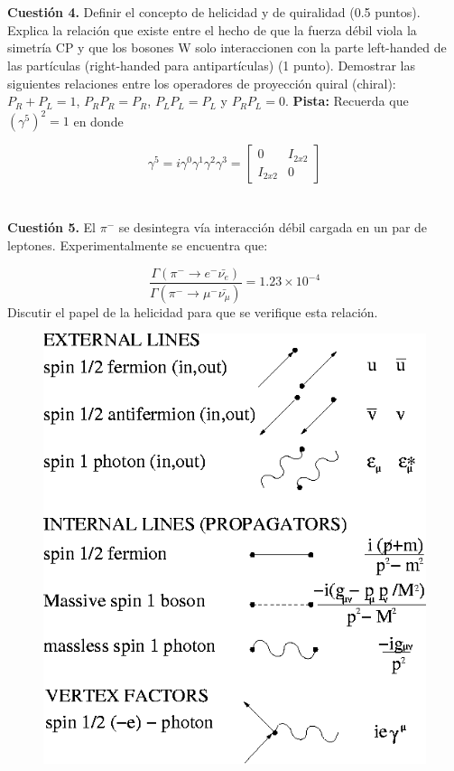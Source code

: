 \documentclass[paper=a4, fontsize=11pt]{scrartcl} %
\numberwithin{equation}{section} %
\numberwithin{figure}{section} %
\numberwithin{table}{section} %
\begin{document}
\\
\\
\textbf{Cuestión 4.} Definir el concepto de helicidad y de quiralidad (0.5 puntos). Explica la relación que existe entre el hecho de que la fuerza débil viola la simetría CP y que los bosones W solo interaccionen
con la parte left-handed de las partículas (right-handed para antipartículas) (1 punto). Demostrar las siguientes relaciones entre los operadores de proyección quiral (chiral): $P_{R} + P_{L} = 1$, $P_{R} P_{R} = P_{R}$, $P_{L} P_{L} = P_{L}$ y $P_R P_L = 0$.
\textbf{Pista:} Recuerda que $(\gamma^5)^2=1$ en donde

\begin{equation*}
\gamma^5 = i\gamma^0\gamma^1\gamma^2\gamma^3 = 
\begin{bmatrix}
    0 & I_{2x2} \\
    I_{2x2} & 0 
\end{bmatrix} 
\end{equation*}
\\
\\
\textbf{Cuestión 5.} El $\pi^{-}$ se desintegra vía interacción débil cargada en un par de leptones. Experimentalmente se encuentra que:

\begin{equation*}
\frac{\Gamma\left (\pi^{-}\rightarrow e^{-}\bar{\nu_e}\right )}{\Gamma\left (\pi^{-}\rightarrow \mu^{-}\bar{\nu_\mu}\right )} = 1.23\times 10^{-4}
\end{equation*}
Discutir el papel de la helicidad para que se verifique esta relación.

\begin{figure}
\begin{center}
\includegraphics[width=0.5\linewidth]{feynmanrules.png}
\end{center}
\end{figure}
\end{document}
